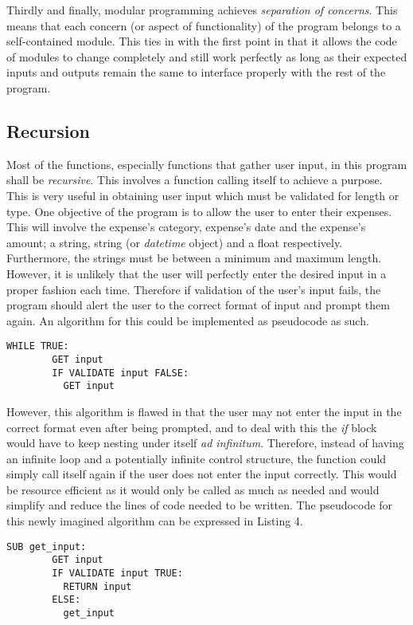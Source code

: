 \documentclass[12pt]{article}
\begin{document}
  Thirdly and finally, modular programming achieves \textit{separation of concerns}. This means that each concern (or aspect of functionality) of the program belongs to a self-contained module. This ties in with the first point in that it allows the code of modules to change completely and still work perfectly as long as their expected inputs and outputs remain the same to interface properly with the rest of the program.
  \subsection{Recursion}
  Most of the functions, especially functions that gather user input, in this program shall be \textit{recursive}. This involves a function calling itself to achieve a purpose. This is very useful in obtaining user input which must be validated for length or type. One objective of the program is to allow the user to enter their expenses. This will involve the expense's category, expense's date and the expense's amount; a string, string (or \textit{datetime} object) and a float respectively. Furthermore, the strings must be between a minimum and maximum length. However, it is unlikely that the user will perfectly enter the desired input in a proper fashion each time. Therefore if validation of the user's input fails, the program should alert the user to the correct format of input and prompt them again.
  An algorithm for this could be implemented as pseudocode as such.
    \begin{lstlisting}[caption=An example pseudocode algorithm to inefficiently obtain valid user input, captionpos=b]
      WHILE TRUE:
        GET input
        IF VALIDATE input FALSE:
          GET input
    \end{lstlisting}

  However, this algorithm is flawed in that the user may not enter the input in the correct format even after being prompted, and to deal with this the \textit{if} block would have to keep nesting under itself \textit{ad infinitum}.
  Therefore, instead of having an infinite loop and a potentially infinite control structure, the function could simply call itself again if the user does not enter the input correctly. This would be resource efficient as it would only be called as much as needed and would simplify and reduce the lines of code needed to be written.
  The pseudocode for this newly imagined algorithm can be expressed in Listing 4.
    \begin{lstlisting}[caption=A correct\, recursive algorithm to obtain valid user input, captionpos=b]
      SUB get_input:
        GET input
        IF VALIDATE input TRUE:
          RETURN input
        ELSE:
          get_input
    \end{lstlisting}
\end{document}
